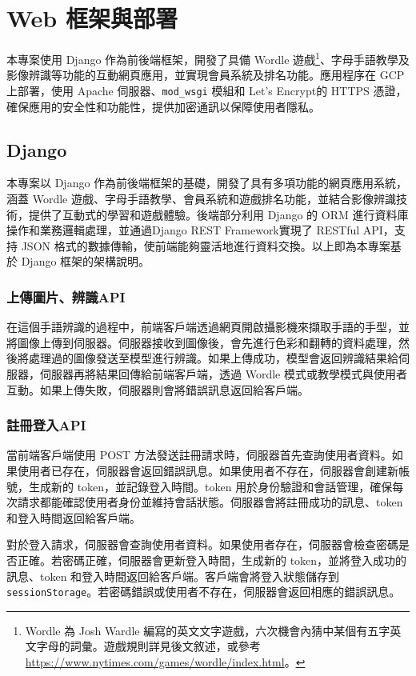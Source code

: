 \documentclass[conference]{IEEEtran}
\begin{document}
\section{Web 框架與部署}

本專案使用 Django 作為前後端框架，開發了具備 Wordle 遊戲\footnote{Wordle 為 Josh Wardle 編寫的英文文字遊戲，六次機會內猜中某個有五字英文字母的詞彙。遊戲規則詳見後文敘述，或參考\url{https://www.nytimes.com/games/wordle/index.html}。}、字母手語教學及影像辨識等功能的互動網頁應用，並實現會員系統及排名功能。應用程序在 GCP 上部署，使用 Apache 伺服器、\verb|mod_wsgi| 模組和 Let's Encrypt的 HTTPS 憑證，確保應用的安全性和功能性，提供加密通訊以保障使用者隱私。

\subsection{Django}
本專案以 Django 作為前後端框架的基礎，開發了具有多項功能的網頁應用系統，涵蓋 Wordle 遊戲、字母手語教學、會員系統和遊戲排名功能，並結合影像辨識技術，提供了互動式的學習和遊戲體驗。後端部分利用 Django 的 ORM 進行資料庫操作和業務邏輯處理，並通過Django REST Framework實現了 RESTful API，支持 JSON 格式的數據傳輸，使前端能夠靈活地進行資料交換。以上即為本專案基於 Django 框架的架構說明。

\subsubsection{上傳圖片、辨識API}
在這個手語辨識的過程中，前端客戶端透過網頁開啟攝影機來擷取手語的手型，並將圖像上傳到伺服器。伺服器接收到圖像後，會先進行色彩和翻轉的資料處理，然後將處理過的圖像發送至模型進行辨識。如果上傳成功，模型會返回辨識結果給伺服器，伺服器再將結果回傳給前端客戶端，透過 Wordle 模式或教學模式與使用者互動。如果上傳失敗，伺服器則會將錯誤訊息返回給客戶端。

\subsubsection{註冊登入API}
當前端客戶端使用 POST 方法發送註冊請求時，伺服器首先查詢使用者資料。如果使用者已存在，伺服器會返回錯誤訊息。如果使用者不存在，伺服器會創建新帳號，生成新的 token，並記錄登入時間。token 用於身份驗證和會話管理，確保每次請求都能確認使用者身份並維持會話狀態。伺服器會將註冊成功的訊息、token 和登入時間返回給客戶端。

對於登入請求，伺服器會查詢使用者資料。如果使用者存在，伺服器會檢查密碼是否正確。若密碼正確，伺服器會更新登入時間，生成新的 token，並將登入成功的訊息、token 和登入時間返回給客戶端。客戶端會將登入狀態儲存到 \verb|sessionStorage|。若密碼錯誤或使用者不存在，伺服器會返回相應的錯誤訊息。
\end{document}
